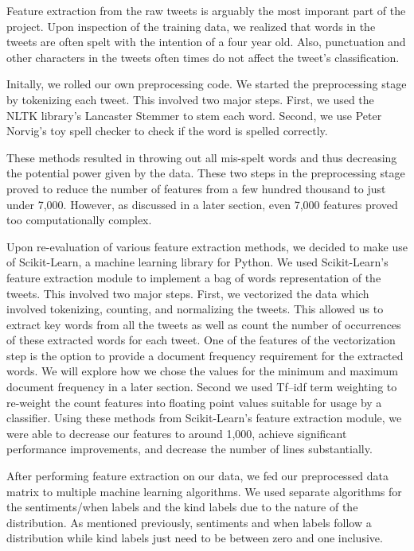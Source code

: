 \documentclass{article}
\begin{document}
Feature extraction from the raw tweets is arguably the most imporant part of the project. Upon inspection of the training data, we realized that words in the tweets are often spelt with the intention of a four year old. Also, punctuation and other characters in the tweets often times do not affect the tweet's classification.

Initally, we rolled our own preprocessing code. We started the preprocessing stage by tokenizing each tweet. This involved two major steps. First, we used the NLTK library's Lancaster Stemmer to stem each word. Second, we use Peter Norvig's toy spell checker to check if the word is spelled correctly.

These methods resulted in throwing out all mis-spelt words and thus decreasing the potential power given by the data. These two steps in the preprocessing stage proved to reduce the number of features from a few hundred thousand to just under 7,000. However, as discussed in a later section, even 7,000 features proved too computationally complex.

Upon re-evaluation of various feature extraction methods, we decided to make use of Scikit-Learn, a machine learning library for Python. We used Scikit-Learn's feature extraction module to implement a bag of words representation of the tweets. This involved two major steps. First, we vectorized the data which involved tokenizing, counting, and normalizing the tweets. This allowed us to extract key words from all the tweets as well as count the number of occurrences of these extracted words for each tweet. One of the features of the vectorization step is the option to provide a document frequency requirement for the extracted words. We will explore how we chose the values for the minimum and maximum document frequency in a later section. Second we used Tf–idf term weighting to re-weight the count features into floating point values suitable for usage by a classifier. Using these methods from Scikit-Learn's feature extraction module, we were able to decrease our features to around 1,000, achieve significant performance improvements, and decrease the number of lines substantially.


After performing feature extraction on our data, we fed our preprocessed data matrix to multiple machine learning algorithms. We used separate algorithms for the sentiments/when labels and the kind labels due to the nature of the distribution. As mentioned previously, sentiments and when labels follow a distribution while kind labels just need to be between zero and one inclusive.
\end{document}
